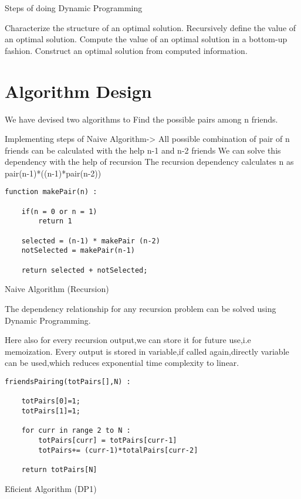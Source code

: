 \documentclass[conference]{IEEEtran}
\begin{document}
Steps of doing Dynamic Programming

Characterize the structure of an optimal solution.
Recursively define the value of an optimal solution.
Compute the value of an optimal solution in a bottom-up fashion.
Construct an optimal solution from computed information.

\section{Algorithm Design}
We have devised two algorithms to Find the possible pairs among n friends.

Implementing steps of Naive Algorithm->
All possible combination of pair of n friends can be calculated with
the help n-1 and n-2 friends
We can solve this dependency with the help of recursion
The recursion dependency calculates n as pair(n-1)*((n-1)*pair(n-2))


\bigskip

\begin{algorithm}[H]
\begin{lstlisting}
function makePair(n) :

    if(n = 0 or n = 1)
        return 1

    selected = (n-1) * makePair (n-2)
    notSelected = makePair(n-1)

    return selected + notSelected;

\end{lstlisting}

 \caption{Naive Algorithm (Recursion) }
\end{algorithm}

\bigskip
The dependency relationship for any recursion problem can be solved
using Dynamic Programming.

\newline Here also for every recursion output,we can store it for future use,i.e memoization.
\newline Every output is stored in variable,if called again,directly variable can be used,which reduces
exponential time complexity to linear.

\bigskip

\begin{algorithm}[H]
\begin{lstlisting}
friendsPairing(totPairs[],N) :

    totPairs[0]=1;
    totPairs[1]=1;

    for curr in range 2 to N :
        totPairs[curr] = totPairs[curr-1]
        totPairs+= (curr-1)*totalPairs[curr-2]

    return totPairs[N]

\end{lstlisting}

 \caption{Eficient Algorithm (DP1)}
\end{algorithm}
\bigskip
\end{document}
